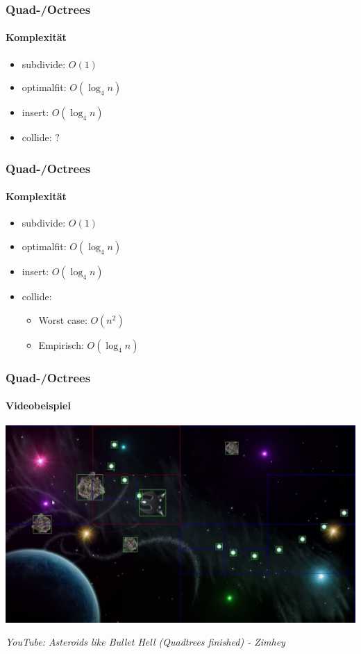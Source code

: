 \documentclass{beamer}
\begin{document}
\begin{frame}
  \frametitle{Quad-/Octrees}
  \framesubtitle{Komplexität}
  \begin{itemize}
    \item subdivide: $O(1)$
    \item optimalfit: $O(\log_4 n)$
    \item insert: $O(\log_4 n)$
    \item collide: $?$
  \end{itemize}
\end{frame}

\begin{frame}
  \frametitle{Quad-/Octrees}
  \framesubtitle{Komplexität}
  \begin{itemize}
    \item subdivide: $O(1)$
    \item optimalfit: $O(\log_4 n)$
    \item insert: $O(\log_4 n)$
    \item collide:
    \begin{itemize}
      \item Worst case: $O(n^2)$
      \item Empirisch: $O(\log_4 n)$
    \end{itemize}
  \end{itemize}
\end{frame}

\begin{frame}
  \frametitle{Quad-/Octrees}
  \framesubtitle{Videobeispiel}
  \begin{center}
    \includegraphics[scale=0.2]{rsrc/asteroids}
    
    \tiny \it YouTube: Asteroids like Bullet Hell (Quadtrees finished) - Zimhey
  \end{center}
\end{frame}
\end{document}
